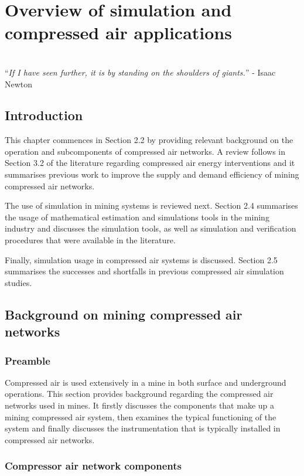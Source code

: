 \chapter{Overview of simulation and compressed air applications}
\label{Chap2}
\thispagestyle{empty}
\vspace{40em}
\hrulefill
\\
\enquote{\textit{If I have seen further, it is by standing on the shoulders of giants.}} - Isaac Newton\\
\clearpage
\section{Introduction}
 This chapter commences in Section 2.2 by providing relevant background on the operation and subcomponents of compressed air networks. A review follows in Section 3.2 of the literature regarding compressed air energy interventions and it summarises previous work to improve the supply and demand efficiency of mining compressed air networks.
\par
The use of simulation in mining systems is reviewed next. Section 2.4 summarises the usage of mathematical estimation and simulations tools in the mining industry and discusses the simulation tools, as well as simulation and verification procedures that were available in the literature.
\par
Finally, simulation usage in compressed air systems is discussed. Section 2.5 summarises the successes and shortfalls in previous compressed air simulation studies.
\section{Background on mining compressed air networks}
\subsection{Preamble}
Compressed air is used extensively in a mine in both surface and underground operations. This section provides background regarding the compressed air networks used in mines. It firstly discusses the components that make up a mining compressed air system, then examines the typical functioning of the system and finally discusses the instrumentation that is typically installed in compressed air networks.
\subsection{Compressor air network components}
